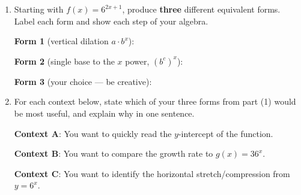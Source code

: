 \documentclass[10pt]{article}
\begin{document}
\begin{tcolorbox}[colback=white, colframe=black!40,
    title=\textbf{Tier E --- Extend},
    fonttitle=\bfseries, arc=2mm, left=3mm, right=3mm, top=2mm, bottom=2mm]

\begin{enumerate}[itemsep=12pt]

  \item Starting with $f(x) = 6^{2x+1}$, produce \textbf{three} different equivalent forms.
        Label each form and show each step of your algebra.

        \vspace{0.06in}
        \textbf{Form 1} (vertical dilation $a \cdot b^x$): \blank{8cm}

        \vspace{0.06in}
        \textbf{Form 2} (single base to the $x$ power, $(b^c)^x$): \blank{7cm}

        \vspace{0.06in}
        \textbf{Form 3} (your choice --- be creative): \blank{8cm}

  \item For each context below, state which of your three forms from part (1) would be most
        useful, and explain why in one sentence.

        \vspace{0.04in}
        \textbf{Context A}: You want to quickly read the $y$-intercept of the function.

        \writeline

        \textbf{Context B}: You want to compare the growth rate to $g(x) = 36^x$.

        \writeline

        \textbf{Context C}: You want to identify the horizontal stretch/compression from
        $y = 6^x$.

        \writeline

\end{enumerate}
\end{tcolorbox}
\end{document}
